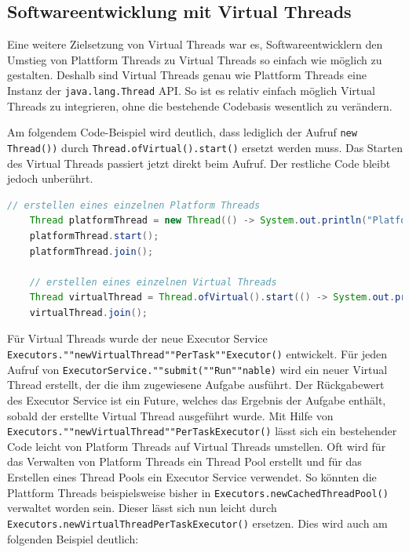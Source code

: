 \documentclass[fontsize=12pt,paper=a4,twoside=semi,parskip=half-,headsepline,headinclude]{scrreprt}
\newcommand{\code}[1]{\texttt{#1}}
\begin{document}
\subsection{Softwareentwicklung mit Virtual Threads}

Eine weitere Zielsetzung von Virtual Threads war es, Softwareentwicklern den Umstieg von Plattform Threads zu Virtual Threads so einfach wie möglich zu gestalten. Deshalb sind Virtual Threads genau wie Plattform Threads eine Instanz der \code{java.lang.Thread} API. So ist es relativ einfach möglich Virtual Threads zu integrieren, ohne die bestehende Codebasis wesentlich zu verändern.

Am folgendem Code-Beispiel wird deutlich, dass lediglich der Aufruf \code{new Thread())} durch \code{Thread.ofVirtual().start()} ersetzt werden muss. Das Starten des Virtual Threads passiert jetzt direkt beim Aufruf. Der restliche Code bleibt jedoch unberührt.

\begin{lstlisting}[language=Java]
	// erstellen eines einzelnen Platform Threads	
	Thread platformThread = new Thread(() -> System.out.println("Platform Thread"));
	platformThread.start();
	platformThread.join();

	// erstellen eines einzelnen Virtual Threads
	Thread virtualThread = Thread.ofVirtual().start(() -> System.out.println("Virtual Thread"));
	virtualThread.join();
\end{lstlisting}

Für Virtual Threads wurde der neue Executor Service \code{Executors.""newVirtualThread""PerTask""Executor()} entwickelt. Für jeden Aufruf von \texttt{ExecutorService.""submit(""Run""nable)} wird ein neuer Virtual Thread erstellt, der die ihm zugewiesene Aufgabe ausführt. Der Rückgabewert des Executor Service ist ein Future, welches das Ergebnis der Aufgabe enthält, sobald der erstellte Virtual Thread ausgeführt wurde. Mit Hilfe von \code{Executors.""newVirtualThread""PerTaskExecutor()} lässt sich ein bestehender Code leicht von Platform Threads auf Virtual Threads umstellen. Oft wird für das Verwalten von Platform Threads ein Thread Pool erstellt und für das Erstellen eines Thread Pools ein Executor Service verwendet. So könnten die Plattform Threads beispielsweise bisher in \code{Executors.newCachedThreadPool()} verwaltet worden sein. Dieser lässt sich nun leicht durch \code{Executors.newVirtualThreadPerTaskExecutor()} ersetzen. Dies wird auch am folgenden Beispiel deutlich:
\end{document}
